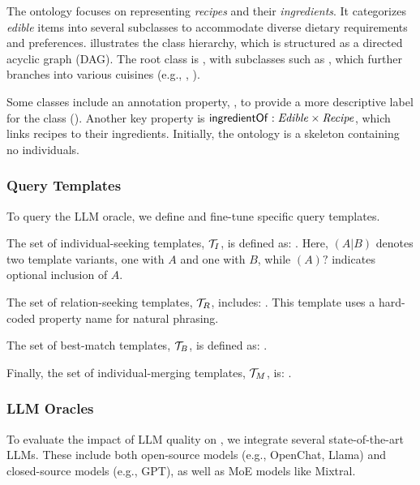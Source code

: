 %
The ontology focuses on representing \emph{recipes} and their \emph{ingredients}.
%
It categorizes \emph{edible} items into several subclasses to accommodate diverse dietary requirements and preferences.
%
 illustrates the class hierarchy, which is structured as a directed acyclic graph (DAG).
%
The root class is , with subclasses such as , which further branches into various cuisines (e.g., , ).

%
Some classes include an annotation property, , to provide a more descriptive label for the class ().
%
Another key property is $\relation{ingredientOf} : \concept{Edible} \times \concept{Recipe}$, which links recipes to their ingredients.
%
Initially, the ontology is a skeleton containing no individuals.

%
\subsubsection{Query Templates}
\label{subsubsec:query-templates}
%
To query the \gls{LLM} oracle, we define and fine-tune specific query templates.

%
The set of individual-seeking templates, $\relset{T}_{I}$, is defined as:
%
.
%
Here, $(A|B)$ denotes two template variants, one with $A$ and one with $B$, while $(A)?$ indicates optional inclusion of $A$.

%
The set of relation-seeking templates, $\relset{T}_{R}$, includes:
%
.
%
This template uses a hard-coded property name for natural phrasing.

%
The set of best-match templates, $\relset{T}_{B}$, is defined as:
%
.

%
Finally, the set of individual-merging templates, $\relset{T}_{M}$, is:
%
.

%
\subsubsection{\gls{LLM} Oracles}
\label{subsubsec:llms-oracles}
%
To evaluate the impact of \gls{LLM} quality on \llmfkg{}, we integrate several state-of-the-art \glspl{LLM}.
%
These include both open-source models (e.g., OpenChat, Llama) and closed-source models (e.g., GPT), as well as \gls{MoE} models like Mixtral.


